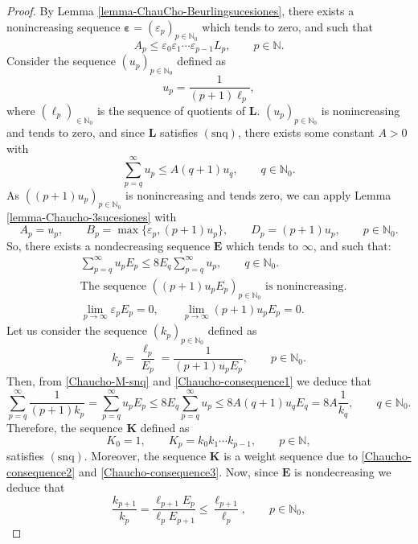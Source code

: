 \documentclass[11pt,a4paper]{article}
\theoremstyle{plain}
\theoremstyle{definition}
\numberwithin{equation}{section}
\newcommand{\N}{\mathbb{N}}
\newcommand{\LL}{{\boldsymbol{L}}}
\newcommand{\bbepsilon}{{\boldsymbol{\varepsilon}}}
\newcommand{\snq}{\operatorname{(snq)}}
\begin{document}
\begin{proof} By Lemma \ref{lemma-ChauCho-Beurlingsucesiones}, there exists a nonincreasing sequence $\bbepsilon=(\varepsilon_p)_{p\in\N_0}$ which tends to zero, and such that
\begin{equation}\label{Desigualdad-LpMp}
	A_p\leq \varepsilon_0\varepsilon_1\cdots \varepsilon_{p-1} L_p,\qquad p\in\N.
\end{equation}
Consider the sequence $(u_p)_{p\in\N_0}$ defined as
\begin{equation*}
	u_p=\frac{1}{(p+1)\ell_p},
\end{equation*}
where $(\ell_p)_{\in\N_0}$ is the sequence of quotients of $\LL$.
$(u_p)_{p\in\N_0}$ is nonincreasing and tends to zero, and since $\LL$ satisfies $\snq$, there exists some constant $A>0$ with
\begin{equation}\label{Chaucho-M-snq}
	\sum_{p=q}^{\infty} u_p\leq A (q+1)u_q, \qquad q\in\N_0.
\end{equation}
As $((p+1)u_p)_{p\in\N_0}$ is nonincreasing and tends zero, we can apply Lemma \ref{lemma-Chaucho-3sucesiones} with
$$
A_p=u_p,\qquad B_p=\max\{\varepsilon_p,(p+1)u_p\},\qquad D_p=(p+1)u_p,\qquad p\in\N_0.
$$
So, there exists a nondecreasing sequence $\boldsymbol{E}$ which tends to $\infty$, and such that:
\begin{align}
& \sum_{p=q}^{\infty}u_pE_p\leq 8 E_q \sum_{p=q}^{\infty}u_p, \qquad q\in\N_0.\label{Chaucho-consequence1}\\
& \text{The sequence $((p+1)u_pE_p)_{p\in\N_0}$ is nonincreasing.}\label{Chaucho-consequence2}\\
& \lim_{p\to\infty}\varepsilon_pE_p=0,\qquad \lim_{p\to\infty}(p+1)u_pE_p=0.\label{Chaucho-consequence3}
\end{align}
Let us consider the sequence $(k_p)_{p\in\N_0}$ defined as
$$
k_p=\frac{\ell_p}{E_p}=\frac{1}{(p+1)u_pE_p}, \qquad p\in\N_0.
$$
Then, from \eqref{Chaucho-M-snq} and \eqref{Chaucho-consequence1} we deduce that
$$
\sum_{p=q}^{\infty} \frac{1}{(p+1)k_p}=\sum_{p=q}^{\infty} u_pE_p\leq 8E_q \sum_{p=q}^{\infty} u_p\leq 8A(q+1)u_qE_q=8A\frac{1}{k_q},\qquad q\in\N_0.
$$
Therefore, the sequence $\boldsymbol{K}$ defined as
$$
K_0=1,\qquad K_p=k_0k_1\cdots k_{p-1}, \qquad p\in\N,
$$
satisfies $\snq$. Moreover, the sequence $\boldsymbol{K}$ is a weight sequence due to \eqref{Chaucho-consequence2} and \eqref{Chaucho-consequence3}.
Now, since $\boldsymbol{E}$ is nondecreasing we deduce that
$$
\frac{k_{p+1}}{k_p}=\frac{\ell_{p+1}E_p}{\ell_pE_{p+1}}\leq \frac{\ell_{p+1}}{\ell_p},\qquad p\in\N_0,
$$
\end{proof}
\end{document}
